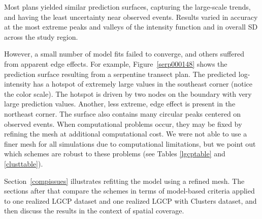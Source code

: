 \documentclass[review]{elsarticle}
\begin{document}
Most plans yielded similar prediction surfaces, capturing the large-scale
trends, and having the least uncertainty near observed events. Results varied
in accuracy at the most extreme peaks and valleys of the intensity function and
in overall SD across the study region.

However, a small number of model fits failed to converge, and others suffered
from apparent edge effects.
For example, Figure~\ref{serp000148} shows the prediction surface resulting
from a serpentine transect plan. The predicted log-intensity has a hotspot of
extremely large values in the southeast corner (notice the color scale). The
hotspot is driven by two nodes on the boundary with very large prediction
values. Another, less extreme, edge effect is present in the northeast corner.
The surface also contains many circular peaks centered on observed events.
When computational problems occur, they may be fixed by refining the mesh at
additional computational cost. We were not able to use a finer mesh for all
simulations due to computational limitations, but we point out which schemes
are robust to these problems (see Tables \ref{lgcptable} and \ref{clusttable}).

Section~\ref{compissues} illustrates refitting the model using a refined mesh.
The sections after that compare the schemes in terms of model-based criteria
applied to one realized LGCP dataset and one realized LGCP with Clusters
dataset, and then discuss the results in the context of spatial coverage.
\end{document}
